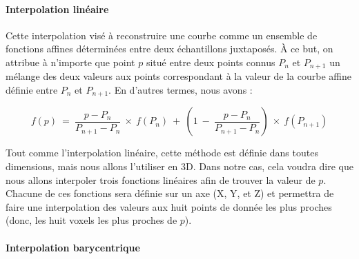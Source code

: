 {{{{{					
				}

				\paragraph*{Interpolation linéaire}
				{
					Cette interpolation visé à reconstruire une courbe comme un ensemble de fonctions affines déterminées entre deux échantillons juxtaposés. À ce but, on attribue à n'importe que point $p$ situé entre deux points connus $P_n$ et $P_{n+1}$ un mélange des deux valeurs aux points correspondant à la valeur de la courbe affine définie entre $P_n$ et $P_{n+1}$. En d'autres termes, nous avons :

					$$f(p)~=~\frac{p-P_n}{P_{n+1}-P_n}~\times~f(P_n)~+~(1~-~\frac{p-P_n}{P_{n+1}-P_n})~\times~f(P_{n+1})$$


					Tout comme l'interpolation linéaire, cette méthode est définie dans toutes dimensions, mais nous allons l'utiliser en 3D. Dans notre cas, cela voudra dire que nous allons interpoler trois fonctions linéaires afin de trouver la valeur de $p$. Chacune de ces fonctions sera définie sur un axe (X, Y, et Z) et permettra de faire une interpolation des valeurs aux huit points de donnée les plus proches (donc, les huit voxels les plus proches de $p$).\par

				}

				\paragraph*{Interpolation barycentrique}
				{
				}
			}
		}
	}

}
